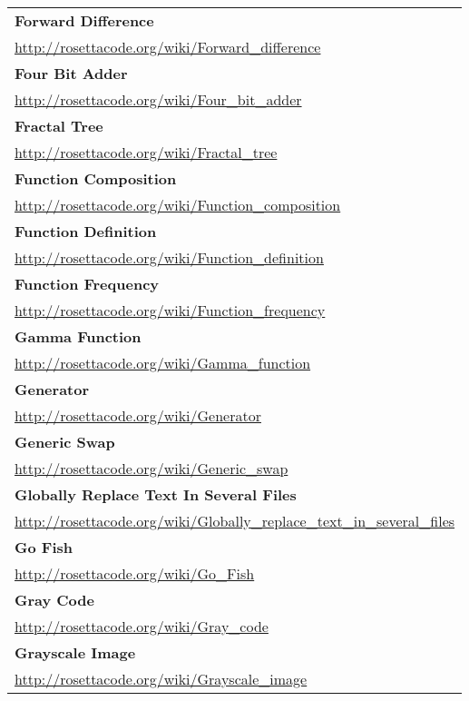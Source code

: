 \begin{longtable}{l}
\textbf{Forward Difference } \\ \href{http://rosettacode.org/wiki/Forward\_difference}{http://rosettacode.org/wiki/Forward\_difference} \\
\textbf{Four Bit Adder } \\ \href{http://rosettacode.org/wiki/Four\_bit\_adder}{http://rosettacode.org/wiki/Four\_bit\_adder} \\
\textbf{
Fractal Tree } \\ \href{http://rosettacode.org/wiki/Fractal\_tree}{http://rosettacode.org/wiki/Fractal\_tree} \\
\textbf{Function Composition } \\ \href{http://rosettacode.org/wiki/Function\_composition}{http://rosettacode.org/wiki/Function\_composition} \\
\textbf{Function Definition } \\ \href{http://rosettacode.org/wiki/Function\_definition}{http://rosettacode.org/wiki/Function\_definition} \\
\textbf{
Function Frequency } \\ \href{http://rosettacode.org/wiki/Function\_frequency}{http://rosettacode.org/wiki/Function\_frequency} \\
\textbf{Gamma Function } \\ \href{http://rosettacode.org/wiki/Gamma\_function}{http://rosettacode.org/wiki/Gamma\_function} \\
\textbf{Generator } \\ \href{http://rosettacode.org/wiki/Generator}{http://rosettacode.org/wiki/Generator} \\
\textbf{Generic Swap } \\ \href{http://rosettacode.org/wiki/Generic\_swap}{http://rosettacode.org/wiki/Generic\_swap} \\
\textbf{
Globally Replace Text In Several Files } \\ \href{http://rosettacode.org/wiki/Globally\_replace\_text\_in\_several\_files}{http://rosettacode.org/wiki/Globally\_replace\_text\_in\_several\_files} \\
\textbf{Go Fish } \\ \href{http://rosettacode.org/wiki/Go\_Fish}{http://rosettacode.org/wiki/Go\_Fish} \\
\textbf{Gray Code } \\ \href{http://rosettacode.org/wiki/Gray\_code}{http://rosettacode.org/wiki/Gray\_code} \\
\textbf{
Grayscale Image } \\ \href{http://rosettacode.org/wiki/Grayscale\_image}{http://rosettacode.org/wiki/Grayscale\_image} \\

\end{longtable}
